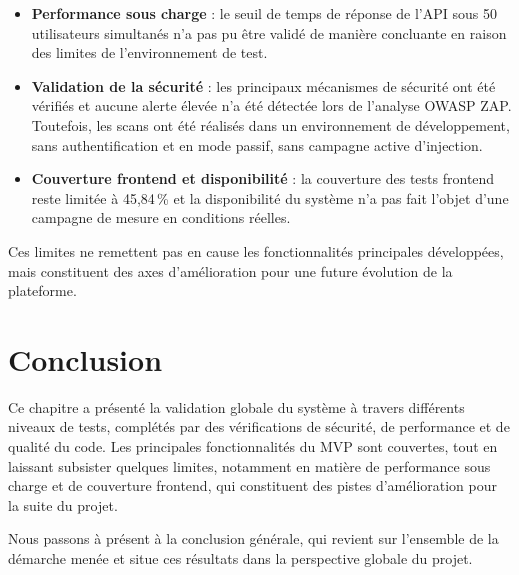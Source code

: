 \begin{itemize}

    \item \textbf{Performance sous charge} : le seuil de temps de réponse de l'API sous 50 utilisateurs simultanés n'a pas pu être validé de manière concluante en raison des limites de l'environnement de test.

    \item \textbf{Validation de la sécurité} : les principaux mécanismes de sécurité ont été vérifiés et aucune alerte élevée n'a été détectée lors de l'analyse OWASP ZAP. Toutefois, les scans ont été réalisés dans un environnement de développement, sans authentification et en mode passif, sans campagne active d'injection.

    \item \textbf{Couverture frontend et disponibilité} : la couverture des tests frontend reste limitée à 45,84\,\% et la disponibilité du système n'a pas fait l'objet d'une campagne de mesure en conditions réelles.

\end{itemize}

Ces limites ne remettent pas en cause les fonctionnalités principales développées, mais constituent des axes d'amélioration pour une future évolution de la plateforme.


\section*{Conclusion}

\justifying



Ce chapitre a présenté la validation globale du système à travers différents niveaux de tests, complétés par des vérifications de sécurité, de performance et de qualité du code. Les principales fonctionnalités du MVP sont couvertes, tout en laissant subsister quelques limites, notamment en matière de performance sous charge et de couverture frontend, qui constituent des pistes d'amélioration pour la suite du projet.

Nous passons à présent à la conclusion générale, qui revient sur l'ensemble de la démarche menée et situe ces résultats dans la perspective globale du projet.
